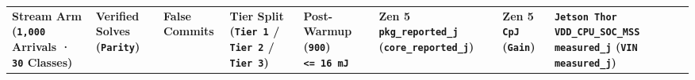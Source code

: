 \documentclass[10pt,letterpaper]{article}
\begin{document}
{\scriptsize\setlength{\tabcolsep}{2.2pt}\renewcommand{\arraystretch}{1.14}
\begin{longtable}[]{@{}
  >{\raggedright\arraybackslash}p{}
  >{\centering\arraybackslash}p{}
  >{\centering\arraybackslash}p{}
  >{\centering\arraybackslash}p{}
  >{\centering\arraybackslash}p{}
  >{\raggedleft\arraybackslash}p{}
  >{\raggedleft\arraybackslash}p{}
  >{\raggedleft\arraybackslash}p{}
  >{\raggedleft\arraybackslash}p{}@{}}
\toprule\noalign{}
\begin{minipage}[b]{\linewidth}\raggedright
\textbf{Stream Arm (\texttt{1,000} Arrivals · \texttt{30} Classes)}
\end{minipage} & \begin{minipage}[b]{\linewidth}\centering
\textbf{Verified Solves (\texttt{Parity})}
\end{minipage} & \begin{minipage}[b]{\linewidth}\centering
\textbf{False Commits}
\end{minipage} & \begin{minipage}[b]{\linewidth}\centering
\textbf{Tier Split (\texttt{Tier\ 1} / \texttt{Tier\ 2} /
\texttt{Tier\ 3})}
\end{minipage} & \begin{minipage}[b]{\linewidth}\centering
\textbf{Post-Warmup (\texttt{900}) \texttt{\textless{}=\ 16\ mJ}}
\end{minipage} & \begin{minipage}[b]{\linewidth}\raggedleft
\textbf{Zen 5 \texttt{pkg\_\allowbreak{}reported\_\allowbreak{}j}
(\texttt{core\_\allowbreak{}reported\_\allowbreak{}j})}
\end{minipage} & \begin{minipage}[b]{\linewidth}\raggedleft
\textbf{Zen 5 \texttt{CpJ} (\texttt{Gain})}
\end{minipage} & \begin{minipage}[b]{\linewidth}\raggedleft
\textbf{\texttt{Jetson\ Thor} \texttt{VDD\_\allowbreak{}CPU\_\allowbreak{}SOC\_\allowbreak{}MSS}
\texttt{measured\_\allowbreak{}j} (\texttt{VIN} \texttt{measured\_\allowbreak{}j})}
\end{minipage} & \begin{minipage}[b]{\linewidth}\raggedleft

\end{minipage}
\end{longtable}}
\end{document}
